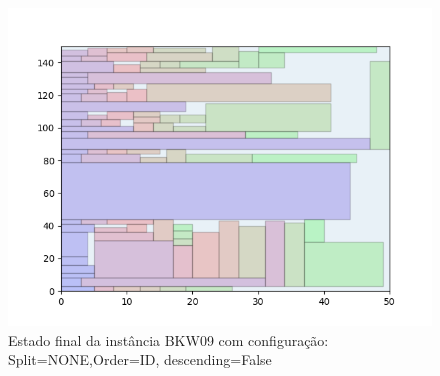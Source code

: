 \begin{figure}[H]
    \centering
    \caption[]{Estado final da instância BKW09 com configuração: Split=NONE,Order=ID, descending=False}
    \label{fig:bkw09-none-id-false}
    \includegraphics[scale=0.5]{output/figures/bkw/bkw09/none/id/false/000}
\end{figure}